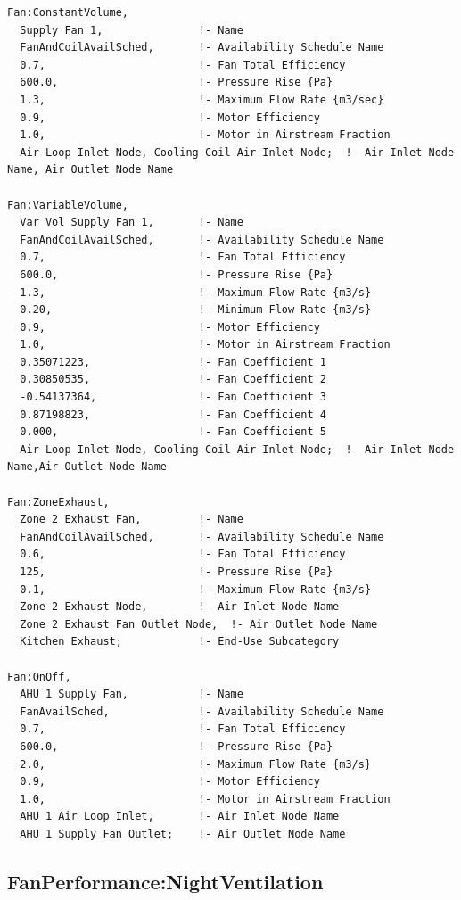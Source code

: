 \begin{lstlisting}
Fan:ConstantVolume,
  Supply Fan 1,               !- Name
  FanAndCoilAvailSched,       !- Availability Schedule Name
  0.7,                        !- Fan Total Efficiency
  600.0,                      !- Pressure Rise {Pa}
  1.3,                        !- Maximum Flow Rate {m3/sec}
  0.9,                        !- Motor Efficiency
  1.0,                        !- Motor in Airstream Fraction
  Air Loop Inlet Node, Cooling Coil Air Inlet Node;  !- Air Inlet Node Name, Air Outlet Node Name

Fan:VariableVolume,
  Var Vol Supply Fan 1,       !- Name
  FanAndCoilAvailSched,       !- Availability Schedule Name
  0.7,                        !- Fan Total Efficiency
  600.0,                      !- Pressure Rise {Pa}
  1.3,                        !- Maximum Flow Rate {m3/s}
  0.20,                       !- Minimum Flow Rate {m3/s}
  0.9,                        !- Motor Efficiency
  1.0,                        !- Motor in Airstream Fraction
  0.35071223,                 !- Fan Coefficient 1
  0.30850535,                 !- Fan Coefficient 2
  -0.54137364,                !- Fan Coefficient 3
  0.87198823,                 !- Fan Coefficient 4
  0.000,                      !- Fan Coefficient 5
  Air Loop Inlet Node, Cooling Coil Air Inlet Node;  !- Air Inlet Node Name,Air Outlet Node Name

Fan:ZoneExhaust,
  Zone 2 Exhaust Fan,         !- Name
  FanAndCoilAvailSched,       !- Availability Schedule Name
  0.6,                        !- Fan Total Efficiency
  125,                        !- Pressure Rise {Pa}
  0.1,                        !- Maximum Flow Rate {m3/s}
  Zone 2 Exhaust Node,        !- Air Inlet Node Name
  Zone 2 Exhaust Fan Outlet Node,  !- Air Outlet Node Name
  Kitchen Exhaust;            !- End-Use Subcategory

Fan:OnOff,
  AHU 1 Supply Fan,           !- Name
  FanAvailSched,              !- Availability Schedule Name
  0.7,                        !- Fan Total Efficiency
  600.0,                      !- Pressure Rise {Pa}
  2.0,                        !- Maximum Flow Rate {m3/s}
  0.9,                        !- Motor Efficiency
  1.0,                        !- Motor in Airstream Fraction
  AHU 1 Air Loop Inlet,       !- Air Inlet Node Name
  AHU 1 Supply Fan Outlet;    !- Air Outlet Node Name
\end{lstlisting}

\subsection{FanPerformance:NightVentilation}\label{fanperformancenightventilation}

